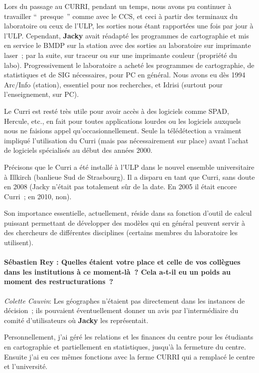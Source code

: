 Lors du passage au CURRI, pendant un temps, nous avons pu continuer à travailler \enquote{ presque } comme avec le CCS, et ceci à partir des terminaux du laboratoire ou ceux de l’ULP, les sorties nous étant rapportées une fois par jour à l’ULP. Cependant, \textbf{Jacky} avait réadapté les programmes de cartographie et mis en service le BMDP sur la station avec des sorties au laboratoire sur imprimante laser ; par la suite, sur traceur ou sur une imprimante couleur (propriété du labo). Progressivement le laboratoire a acheté les programmes de cartographie, de statistiques et de SIG nécessaires, pour PC en général. Nous avons eu dès 1994 Arc/Info (station), essentiel pour nos recherches, et Idrisi (surtout pour l’enseignement, sur PC).

Le Curri est resté très utile pour avoir accès à des logiciels comme SPAD, Hercule, etc., en fait pour toutes applications lourdes ou les logiciels auxquels nous ne faisions appel qu’occasionnellement. Seule la télédétection a vraiment impliqué l’utilisation du Curri (mais pas nécessairement sur place) avant l’achat de logiciels spécialisés au début des années 2000.

Précisons que le Curri a été installé à l’ULP dans le nouvel ensemble universitaire à Illkirch (banlieue Sud de Strasbourg). Il a disparu en tant que Curri, sans doute en 2008 (Jacky n’était pas totalement sûr de la date. En 2005 il était encore Curri ; en 2010, non). 

Son importance essentielle, actuellement, réside dans sa fonction d’outil de calcul puissant permettant de développer des modèles qui en général peuvent servir à des chercheurs de différentes disciplines (certains membres du laboratoire les utilisent).

\paragraph*{Sébastien Rey : Quelles étaient votre place et celle de vos collègues dans les institutions à ce moment-là ? Cela a-t-il eu un poids au moment des restructurations ?}

\noindent\emph{Colette Cauvin}: Les géographes n’étaient pas directement dans les instances de décision ; ils pouvaient éventuellement donner un avis par l’intermédiaire du comité d’utilisateurs où \textbf{Jacky} les représentait.

Personnellement, j’ai géré les relations et les finances du centre pour les étudiants en cartographie et partiellement en statistiques, jusqu’à la fermeture du centre. Ensuite j’ai eu ces mêmes fonctions avec la ferme CURRI qui a remplacé le centre et l’université.

